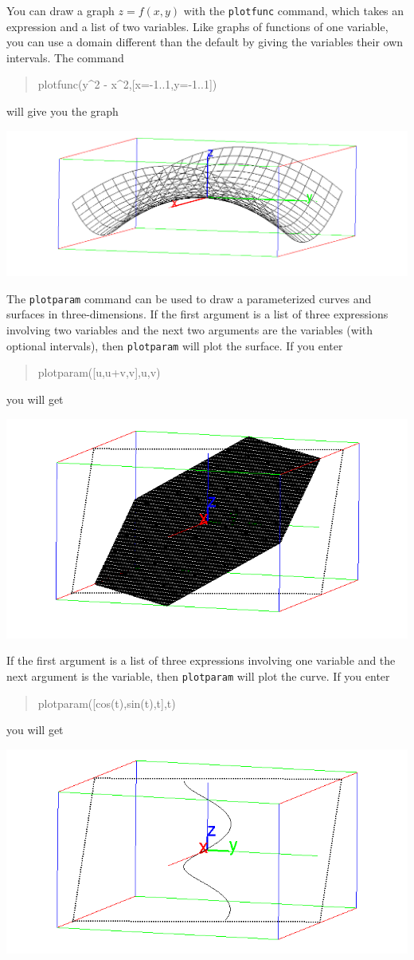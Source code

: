 \documentclass{article}
\newcommand{\xcasin}[1]
{\begin{quote}\ttfamily
#1
\end{quote}}
\begin{document}
You can draw a graph $z = f(x,y)$ with the \texttt{plotfunc} command,
which takes an expression and a list of two variables.  Like graphs of
functions of one variable, you can use a domain different than the
default by giving the variables their own intervals.  The command
\xcasin{plotfunc(y\^{}2 - x\^{}2,[x=-1..1,y=-1..1])}
will give you the graph
\begin{center}
\includegraphics[width=\textwidth]{xcas-3dplot.png}
\end{center}

The \texttt{plotparam} command can be used to draw a parameterized
curves and surfaces in three-dimensions.  If the first argument is a
list of three expressions involving two variables and the next two
arguments are the variables (with optional intervals), then
\texttt{plotparam} will plot the surface.   If you enter
\xcasin{plotparam([u,u+v,v],u,v)}
you will get
\begin{center}
\includegraphics[width=\textwidth]{xcas-3dparam.png}
\end{center}
If the first argument is a list of three expressions involving one
variable and the next argument is the variable, then
\texttt{plotparam} will plot the curve.  If you enter
\xcasin{plotparam([cos(t),sin(t),t],t)}
you will get
\begin{center}
\includegraphics[width=\textwidth]{xcas-3dcurve.png}
\end{center}
\end{document}
